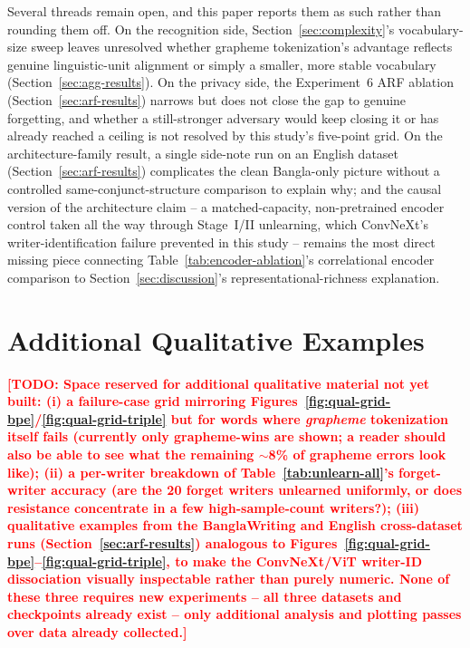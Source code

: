 \documentclass[a4paper,fleqn]{cas-dc}
\newcommand{\todo}[1]{\textcolor{red}{\textbf{[TODO: #1]}}}
\begin{document}
Several threads remain open, and this paper reports them as such rather
than rounding them off. On the recognition side,
Section~\ref{sec:complexity}'s vocabulary-size sweep leaves unresolved
whether grapheme tokenization's advantage reflects genuine
linguistic-unit alignment or simply a smaller, more stable vocabulary
(Section~\ref{sec:agg-results}). On the privacy side, the Experiment~6
ARF ablation (Section~\ref{sec:arf-results}) narrows but does not close
the gap to genuine forgetting, and whether a still-stronger adversary
would keep closing it or has already reached a ceiling is not resolved by
this study's five-point grid. On the architecture-family result, a single
side-note run on an English dataset (Section~\ref{sec:arf-results})
complicates the clean Bangla-only picture without a controlled
same-conjunct-structure comparison to explain why; and the causal version
of the architecture claim -- a matched-capacity, non-pretrained encoder
control taken all the way through Stage~I/II unlearning, which ConvNeXt's
writer-identification failure prevented in this study -- remains the most
direct missing piece connecting Table~\ref{tab:encoder-ablation}'s
correlational encoder comparison to Section~\ref{sec:discussion}'s
representational-richness explanation.

\appendix
\section{Additional Qualitative Examples}
\label{sec:appendix}

\todo{Space reserved for additional qualitative material not yet built:
(i) a failure-case grid mirroring Figures~\ref{fig:qual-grid-bpe}/\ref{fig:qual-grid-triple}
but for words where \emph{grapheme} tokenization itself fails (currently
only grapheme-wins are shown; a reader should also be able to see what
the remaining $\sim$8\% of grapheme errors look like); (ii) a per-writer
breakdown of Table~\ref{tab:unlearn-all}'s forget-writer accuracy (are the
20 forget writers unlearned uniformly, or does resistance concentrate in
a few high-sample-count writers?); (iii) qualitative examples from the
BanglaWriting and English cross-dataset runs
(Section~\ref{sec:arf-results}) analogous to
Figures~\ref{fig:qual-grid-bpe}--\ref{fig:qual-grid-triple}, to make the
ConvNeXt/ViT writer-ID dissociation visually inspectable rather than
purely numeric. None of these three requires new experiments -- all three
datasets and checkpoints already exist -- only additional analysis and
plotting passes over data already collected.}

\printcredits



\end{document}
